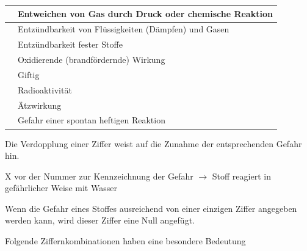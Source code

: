 \documentclass{article}
\begin{document}
\begin{flushleft}
\tablehead{}\begin{supertabular}{|m{0.97999996cm}m{12.317cm}|}
\hline
{}\par

 &
Entweichen von Gas durch Druck oder chemische Reaktion

\\\hline
{}\par

 &
Entz\"undbarkeit von Fl\"ussigkeiten (D\"ampfen) und Gasen

\\\hline
{}\par

 &
Entz\"undbarkeit fester Stoffe

\\\hline
{}\par

 &
Oxidierende (brandf\"ordernde) Wirkung

\\\hline
{}\par

 &
Giftig

\\\hline
{}\par

 &
Radioaktivit\"at

\\\hline
{}\par

 &
\"Atzwirkung

\\\hline
{}\par

 &
Gefahr einer spontan heftigen Reaktion

\\\hline
\end{supertabular}
\end{flushleft}
Die Verdopplung einer Ziffer weist auf die Zunahme der entsprechenden 
Gefahr hin.

X  vor der Nummer zur Kennzeichnung der Gefahr ${\rightarrow}$ Stoff
reagiert in  gef\"ahrlicher Weise mit Wasser

Wenn die Gefahr eines Stoffes ausreichend von einer einzigen Ziffer 
angegeben werden kann, wird dieser Ziffer eine Null angef\"ugt.

Folgende Ziffernkombinationen haben eine besondere Bedeutung
\end{document}
